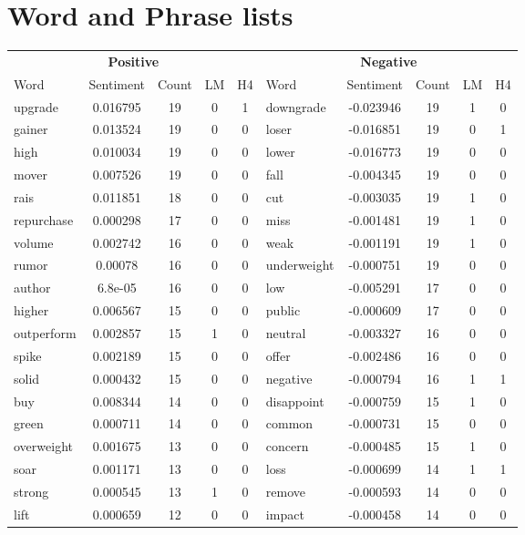 \documentclass[ oneside,%
                    author={Joshua Felmeden},
                    degree={MEng},
                     title={Sentiment Analysis of Financial Headlines Based on Realised Stock Returns},
                  subtitle={Research}]{dissertation}
\begin{document}
\chapter{Word and Phrase lists}
\begin{table}[!ht]
\centering
\begin{tabular}{lcccclcccc}
\multicolumn{5}{c}{\textbf{Positive}} & \multicolumn{5}{c}{\textbf{Negative}} \\
\cmidrule(lr){1-5}
\cmidrule(lr){6-10}
Word & Sentiment & Count & LM & H4 & Word & Sentiment & Count & LM & H4 \\
\cmidrule(lr){1-5}
\cmidrule(lr){6-10}
upgrade & 0.016795 & 19 & 0 & 1 & downgrade & -0.023946 & 19 & 1 & 0 \\
gainer & 0.013524 & 19 & 0 & 0 & loser & -0.016851 & 19 & 0 & 1 \\
high & 0.010034 & 19 & 0 & 0 & lower & -0.016773 & 19 & 0 & 0 \\
mover & 0.007526 & 19 & 0 & 0 & fall & -0.004345 & 19 & 0 & 0 \\
rais & 0.011851 & 18 & 0 & 0 & cut & -0.003035 & 19 & 1 & 0 \\
repurchase & 0.000298 & 17 & 0 & 0 & miss & -0.001481 & 19 & 1 & 0 \\
volume & 0.002742 & 16 & 0 & 0 & weak & -0.001191 & 19 & 1 & 0 \\
rumor & 0.00078 & 16 & 0 & 0 & underweight & -0.000751 & 19 & 0 & 0 \\
author & 6.8e-05 & 16 & 0 & 0 & low & -0.005291 & 17 & 0 & 0 \\
higher & 0.006567 & 15 & 0 & 0 & public & -0.000609 & 17 & 0 & 0 \\
outperform & 0.002857 & 15 & 1 & 0 & neutral & -0.003327 & 16 & 0 & 0 \\
spike & 0.002189 & 15 & 0 & 0 & offer & -0.002486 & 16 & 0 & 0 \\
solid & 0.000432 & 15 & 0 & 0 & negative & -0.000794 & 16 & 1 & 1 \\
buy & 0.008344 & 14 & 0 & 0 & disappoint & -0.000759 & 15 & 1 & 0 \\
green & 0.000711 & 14 & 0 & 0 & common & -0.000731 & 15 & 0 & 0 \\
overweight & 0.001675 & 13 & 0 & 0 & concern & -0.000485 & 15 & 1 & 0 \\
soar & 0.001171 & 13 & 0 & 0 & loss & -0.000699 & 14 & 1 & 1 \\
strong & 0.000545 & 13 & 1 & 0 & remove & -0.000593 & 14 & 0 & 0 \\
lift & 0.000659 & 12 & 0 & 0 & impact & -0.000458 & 14 & 0 & 0 \\

\end{tabular}
\end{table}
\end{document}
